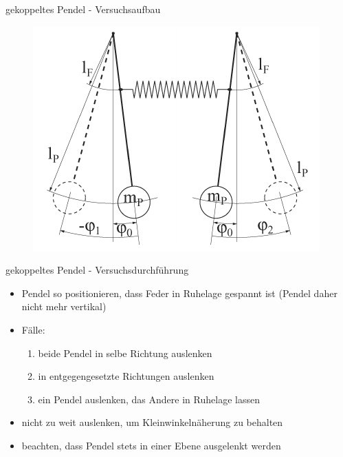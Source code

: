 \documentclass[12pt]{beamer}
\begin{document}
\begin{frame}{gekoppeltes Pendel - Versuchsaufbau}
\begin{figure}
	\centering
	\includegraphics[scale=0.6]{Selection_074.jpg}
\end{figure}
\end{frame}


\begin{frame}{gekoppeltes Pendel - Versuchsdurchführung}
\begin{itemize}
\item Pendel so positionieren, dass Feder in Ruhelage gespannt ist (Pendel daher nicht mehr vertikal) 
\item Fälle:
	\begin{enumerate}
		\item beide Pendel in selbe Richtung auslenken
		\item in entgegengesetzte Richtungen auslenken
		\item ein Pendel auslenken, das Andere in Ruhelage lassen
	\end{enumerate}
\item nicht zu weit auslenken, um Kleinwinkelnäherung zu behalten
\item beachten, dass Pendel stets in einer Ebene ausgelenkt werden
\end{itemize}
\end{frame}
\end{document}
